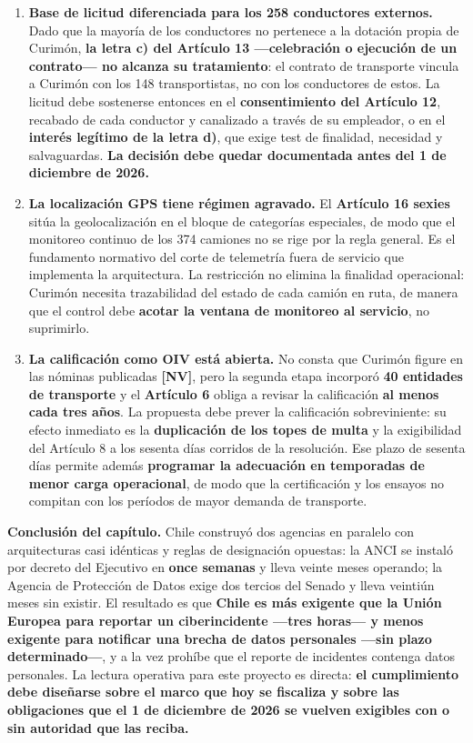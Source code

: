 \begin{enumerate}
\def\labelenumi{\arabic{enumi}.}
\item
  \textbf{Base de licitud diferenciada para los 258 conductores externos.} Dado que la mayoría de los conductores no pertenece a la dotación propia de Curimón, \textbf{la letra c) del Artículo 13 ---celebración o ejecución de un contrato--- no alcanza su tratamiento}: el contrato de transporte vincula a Curimón con los 148 transportistas, no con los conductores de estos. La licitud debe sostenerse entonces en el \textbf{consentimiento del Artículo 12}, recabado de cada conductor y canalizado a través de su empleador, o en el \textbf{interés legítimo de la letra d)}, que exige test de finalidad, necesidad y salvaguardas. \textbf{La decisión debe quedar documentada antes del 1 de diciembre de 2026.}
\item
  \textbf{La localización GPS tiene régimen agravado.} El \textbf{Artículo 16 sexies} sitúa la geolocalización en el bloque de categorías especiales, de modo que el monitoreo continuo de los 374 camiones no se rige por la regla general. Es el fundamento normativo del corte de telemetría fuera de servicio que implementa la arquitectura. La restricción no elimina la finalidad operacional: Curimón necesita trazabilidad del estado de cada camión en ruta, de manera que el control debe \textbf{acotar la ventana de monitoreo al servicio}, no suprimirlo.
\item
  \textbf{La calificación como OIV está abierta.} No consta que Curimón figure en las nóminas publicadas \textbf{{[}NV{]}}, pero la segunda etapa incorporó \textbf{40 entidades de transporte} y el \textbf{Artículo 6} obliga a revisar la calificación \textbf{al menos cada tres años}. La propuesta debe prever la calificación sobreviniente: su efecto inmediato es la \textbf{duplicación de los topes de multa} y la exigibilidad del Artículo 8 a los sesenta días corridos de la resolución. Ese plazo de sesenta días permite además \textbf{programar la adecuación en temporadas de menor carga operacional}, de modo que la certificación y los ensayos no compitan con los períodos de mayor demanda de transporte.
\end{enumerate}

\textbf{Conclusión del capítulo.} Chile construyó dos agencias en paralelo con arquitecturas casi idénticas y reglas de designación opuestas: la ANCI se instaló por decreto del Ejecutivo en \textbf{once semanas} y lleva veinte meses operando; la Agencia de Protección de Datos exige dos tercios del Senado y lleva veintiún meses sin existir. El resultado es que \textbf{Chile es más exigente que la Unión Europea para reportar un ciberincidente ---tres horas--- y menos exigente para notificar una brecha de datos personales ---sin plazo determinado---}, y a la vez prohíbe que el reporte de incidentes contenga datos personales. La lectura operativa para este proyecto es directa: \textbf{el cumplimiento debe diseñarse sobre el marco que hoy se fiscaliza y sobre las obligaciones que el 1 de diciembre de 2026 se vuelven exigibles con o sin autoridad que las reciba.}

